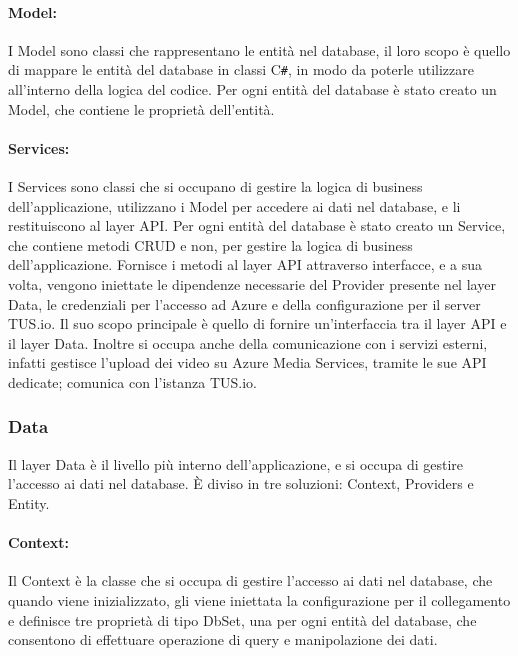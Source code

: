 \paragraph{Model:}
I Model sono classi che rappresentano le entità nel database, il loro scopo è quello di mappare le entità del database in classi C\texttt{\#}, in modo da poterle utilizzare all'interno della logica del codice. Per ogni entità del database è stato creato un Model, che contiene le proprietà dell'entità.\\

\paragraph{Services:}
I Services sono classi che si occupano di gestire la logica di business dell'applicazione, utilizzano i Model per accedere ai dati nel database, e li restituiscono al layer API. Per ogni entità del database è stato creato un Service, che contiene  metodi CRUD e non, per gestire la logica di business dell'applicazione. Fornisce i metodi al layer API attraverso interfacce, e a sua volta, vengono iniettate le dipendenze necessarie del Provider presente nel layer Data, le credenziali per l'accesso ad Azure e della configurazione per il server TUS.io. Il suo scopo principale è quello di fornire un'interfaccia tra il layer API e il layer Data. Inoltre si occupa anche della comunicazione con i servizi esterni, infatti gestisce l'upload dei video su Azure Media Services, tramite le sue API dedicate; comunica con l'istanza TUS.io.\\

\subsubsection{Data}
Il layer Data è il livello più interno dell'applicazione, e si occupa di gestire l'accesso ai dati nel database. È diviso in tre soluzioni: Context, Providers e Entity.\\

\paragraph{Context:}
Il Context è la classe che si occupa di gestire l'accesso ai dati nel database, che quando viene inizializzato, gli viene iniettata la configurazione per il collegamento e definisce tre proprietà di tipo DbSet, una per ogni entità del database, che consentono di effettuare operazione di query e manipolazione dei dati.\\

